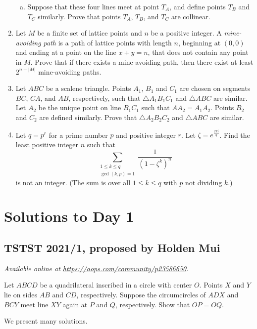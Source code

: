 \documentclass[11pt]{scrartcl}
\begin{document}
\begin{enumerate}[\bfseries 1.]
\begin{enumerate}[(a)]
  \item Suppose that these four lines meet at point $T_A$,
    and define points $T_B$ and $T_C$ similarly.
    Prove that points $T_A$, $T_B$, and $T_C$ are collinear.
\end{enumerate}

\item %
Let $M$ be a finite set of lattice points
and $n$ be a positive integer.
A \emph{mine-avoiding path} is a path of lattice points with length $n$,
beginning at $(0,0)$ and ending at a point on the line $x+y=n$,
that does not contain any point in $M$.
Prove that if there exists a mine-avoiding path,
then there exist at least $2^{n-|M|}$ mine-avoiding paths.

\item %
Let $ABC$ be a scalene triangle.
Points $A_1$, $B_1$ and $C_1$ are chosen
on segments $BC$, $CA$, and $AB$, respectively,
such that $\triangle A_1B_1C_1$ and $\triangle ABC$
are similar.
Let $A_2$ be the unique point on line $B_1C_1$
such that $AA_2 = A_1A_2$.
Points $B_2$ and $C_2$ are defined similarly.
Prove that $\triangle A_2B_2C_2$ and $\triangle ABC$ are similar.

\item %
Let $q=p^r$ for a prime number $p$ and positive integer $r$.
Let $\zeta = e^{\frac{2\pi i}{q}}$.
Find the least positive integer $n$ such that
\[
  \sum_{\substack{1 \le k \le q \\ \gcd(k,p) = 1}}
  \frac{1}{(1 - \zeta^k)^n}
\]
is not an integer.
(The sum is over all $1\leq k\leq q$ with $p$ not dividing $k$.)

\end{enumerate}
\pagebreak

\section{Solutions to Day 1}
\subsection{TSTST 2021/1, proposed by Holden Mui}
\textsl{Available online at \url{https://aops.com/community/p23586650}.}
\begin{mdframed}[style=mdpurplebox,frametitle={Problem statement}]
Let $ABCD$ be a quadrilateral inscribed in a circle with center $O$.
Points $X$ and $Y$ lie on sides $AB$ and $CD$, respectively.
Suppose the circumcircles of $ADX$ and $BCY$
meet line $XY$ again at $P$ and $Q$, respectively.
Show that $OP=OQ$.
\end{mdframed}
We present many solutions.
\end{document}
